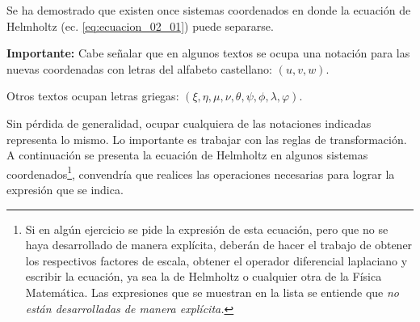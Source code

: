 \documentclass[12pt]{article}
\numberwithin{equation}{section}
\begin{document}
Se ha demostrado que existen once sistemas coordenados en donde la ecuación de Helmholtz  (ec. \ref{eq:ecuacion_02_01}) puede separarse. 
\par
\textbf{Importante: } Cabe señalar que en algunos textos se ocupa una notación para las nuevas coordenadas con letras del alfabeto castellano: $(u, v, w)$.
\par
Otros textos ocupan letras griegas: $(\xi, \eta, \mu, \nu, \theta, \psi, \phi, \lambda, \varphi)$.
\par
Sin pérdida de generalidad, ocupar cualquiera de las notaciones indicadas representa lo mismo. Lo importante es trabajar con las reglas de transformación. A continuación se presenta la ecuación de Helmholtz en algunos sistemas coordenados\footnote{Si en algún ejercicio se pide la expresión de esta ecuación, pero que no se haya desarrollado de manera explícita, deberán de hacer el trabajo de obtener los respectivos factores de escala, obtener el operador diferencial laplaciano y escribir la ecuación, ya sea la de Helmholtz o cualquier otra de la Física Matemática. Las expresiones que se muestran en la lista se entiende que \emph{no están desarrolladas de manera explícita.}}, convendría que realices las operaciones necesarias para lograr la expresión que se indica.
\par
\end{document}
